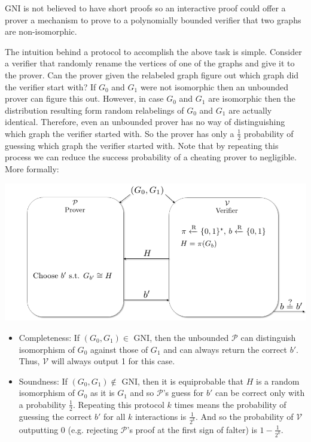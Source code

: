 GNI is not believed to have short proofs so an interactive proof could offer a prover a mechanism to prove to a polynomially bounded verifier that two graphs are non-isomorphic. 


The intuition behind a protocol to accomplish the above task is simple. Consider a verifier that randomly rename the vertices of one of the graphs and give it to the prover. Can the prover given the relabeled graph figure out which graph did the verifier start with?  If $G_0$ and $G_1$ were not isomorphic  then an unbounded prover can figure this out. However, in case $G_0$ and $G_1$ {are} isomorphic then the distribution resulting form random relabelings of $G_0$ and $G_1$ are actually identical. Therefore, even an unbounded prover has no way of distinguishing which graph the verifier started with. So the prover has only a $\frac12$ probability of guessing which graph the verifier started with. Note that by repeating this process we can reduce the success probability of a cheating prover to negligible. More formally:


		\begin{center}
			\includegraphics[scale=.51094]{GNI_IP_Protocol.png}
		\end{center}

		\begin{itemize}
			\item Completeness: If $(G_0,G_1)\in$ GNI, then the unbounded $\mathcal{P}$ can distinguish isomorphism of $G_0$ against those of $G_1$ and can always return the correct $b'$.  Thus, $\mathcal{V}$ will always output 1 for this case.
			\item Soundness: If $(G_0,G_1)\notin$ GNI, then it is equiprobable that $H$ is a random isomorphism of $G_0$ as it is $G_1$ and so $\mathcal{P}$'s guess for $b'$ can be correct only with a probability $\frac{1}{2}$.  Repeating this protocol $k$ times means the probability of guessing the correct $b'$ for all $k$ interactions is $\frac{1}{2^k}$.  And so the probability of $\mathcal{V}$ outputting 0 (e.g. rejecting $\mathcal{P}$'s proof at the first sign of falter) is $1-\frac{1}{2^k}$. 
		\end{itemize}


